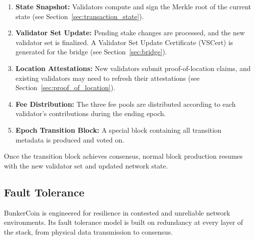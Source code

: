 \documentclass{article}
\begin{document}
\begin{enumerate}
    \item \textbf{State Snapshot:} Validators compute and sign the Merkle root of the current state (see Section~\ref{sec:transaction_state}).
    \item \textbf{Validator Set Update:} Pending stake changes are processed, and the new validator set is finalized. A Validator Set Update Certificate (VSCert) is generated for the bridge (see Section~\ref{sec:bridge}).
    \item \textbf{Location Attestations:} New validators submit proof-of-location claims, and existing validators may need to refresh their attestations (see Section~\ref{sec:proof_of_location}).
    \item \textbf{Fee Distribution:} The three fee pools are distributed according to each validator's contributions during the ending epoch.
    \item \textbf{Epoch Transition Block:} A special block containing all transition metadata is produced and voted on.
\end{enumerate}

Once the transition block achieves consensus, normal block production resumes with the new validator set and updated network state.

\subsection{Fault Tolerance}

BunkerCoin is engineered for resilience in contested and unreliable network environments. Its fault tolerance model is built on redundancy at every layer of the stack, from physical data transmission to consensus.
\end{document}
